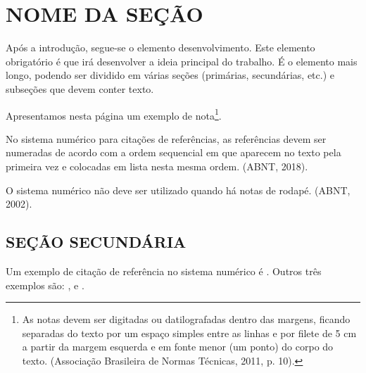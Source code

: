 \documentclass[
  oneside, %
  english,
  brazil
]{abntbibufjf}
\begin{document}
\chapter{NOME DA SEÇÃO}

Após a introdução, segue-se o elemento desenvolvimento.
Este elemento obrigatório é que irá desenvolver a ideia principal do trabalho.
É o elemento mais longo, podendo ser dividido em várias seções (primárias, secundárias, etc.) e subseções que devem conter texto.

Apresentamos nesta página um exemplo de nota\footnote{\noindent
  As notas devem ser digitadas ou datilografadas dentro das margens, ficando separadas do texto por um espaço simples entre as linhas e por filete de 5 cm a partir da margem esquerda e em fonte menor (um ponto) do corpo do texto.
  (Associação Brasileira de Normas Técnicas, 2011, p. 10).
}.

No sistema numérico para citações de referências, as referências devem ser numeradas de acordo com a ordem sequencial em que aparecem no texto pela primeira vez e colocadas em lista nesta mesma ordem. (ABNT, 2018).

O sistema numérico não deve ser utilizado quando há notas de rodapé. (ABNT, 2002).

\section{SEÇÃO SECUNDÁRIA}


Um exemplo de citação de referência no sistema numérico é \cite{disp2019}.
Outros três exemplos são: \cite{Bauman99}, \cite{vet18} e \cite{Aguiar2009}.



\end{document}
